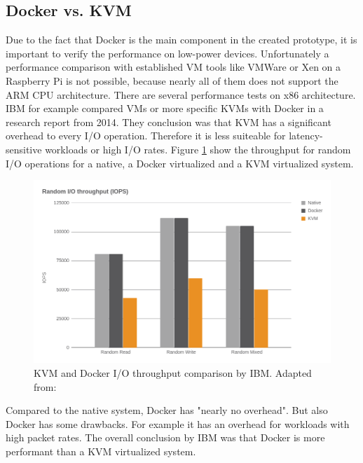 \subsection{Docker vs. KVM}
Due to the fact that Docker is the main component in the created prototype, it is important to verify the performance on low-power devices.
Unfortunately a performance comparison with established \ac{VM} tools like VMWare or Xen on a Raspberry Pi is not possible, because nearly all of them does not support the ARM \ac{CPU} architecture.
There are several performance tests on x86 architecture.
IBM for example compared \acp{VM} or more specific \acp{KVM} with Docker in a research report\autocite{IBM:Performance:2014} from 2014.
They conclusion was that \ac{KVM} has a significant overhead to every I/O operation.
Therefore it is less suiteable for latency-sensitive workloads or high I/O rates.
Figure \ref{fig:ibm_kvm_docker_io} show the throughput for random I/O operations for a native, a Docker virtualized and a \ac{KVM} virtualized system.

\begin{figure}[H]
    \centering
    \includegraphics[width=\textwidth]{resources/images/performance_ibm_kvm_docker_io.png}
    \caption[KVM and Docker I/O throughput comparison by IBM]{KVM and Docker I/O throughput comparison by IBM. Adapted from: \autocite[p. 6]{IBM:Performance:2014}}
    \label{fig:ibm_kvm_docker_io}
\end{figure}

Compared to the native system, Docker has "nearly no overhead"\autocite[p. 6]{IBM:Performance:2014}.
But also Docker has some drawbacks.
For example it has an overhead for workloads with high packet rates.\autocite[cf.][p. 6]{IBM:Performance:2014}
The overall conclusion by IBM was that Docker is more performant than a \ac{KVM} virtualized system.

